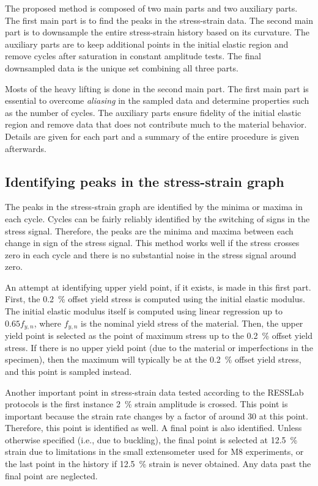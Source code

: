 \documentclass[a4paper,11pt]{article}
\begin{document}
The proposed method is composed of two main parts and two auxiliary parts.
The first main part is to find the peaks in the stress-strain data.
The second main part is to downsample the entire stress-strain history based on its curvature.
The auxiliary parts are to keep additional points in the initial elastic region and remove cycles after saturation in constant amplitude tests.
The final downsampled data is the unique set combining all three parts.

Mosts of the heavy lifting is done in the second main part.
The first main part is essential to overcome \emph{aliasing} in the sampled data and determine properties such as the number of cycles.
The auxiliary parts ensure fidelity of the initial elastic region and remove data that does not contribute much to the material behavior.
Details are given for each part and a summary of the entire procedure is given afterwards.

\subsection{Identifying peaks in the stress-strain graph}

The peaks in the stress-strain graph are identified by the minima or maxima in each cycle.
Cycles can be fairly reliably identified by the switching of signs in the stress signal.
Therefore, the peaks are the minima and maxima between each change in sign of the stress signal.
This method works well if the stress crosses zero in each cycle and there is no substantial noise in the stress signal around zero.

An attempt at identifying upper yield point, if it exists, is made in this first part.
First, the 0.2~\% offset yield stress is computed using the initial elastic modulus.
The initial elastic modulus itself is computed using linear regression up to $0.65 f_{y,n}$, where $f_{y,n}$ is the nominal yield stress of the material.
Then, the upper yield point is selected as the point of maximum stress up to the 0.2~\% offset yield stress.
If there is no upper yield point (due to the material or imperfections in the specimen), then the maximum will typically be at the 0.2~\% offset yield stress, and this point is sampled instead.

Another important point in stress-strain data tested according to the RESSLab protocols is the first instance 2~\% strain amplitude is crossed.
This point is important because the strain rate changes by a factor of around 30 at this point.
Therefore, this point is identified as well.
A final point is also identified.
Unless otherwise specified (i.e., due to buckling), the final point is selected at 12.5~\% strain due to limitations in the small extensometer used for M8 experiments, or the last point in the history if 12.5~\% strain is never obtained.
Any data past the final point are neglected.
\end{document}
